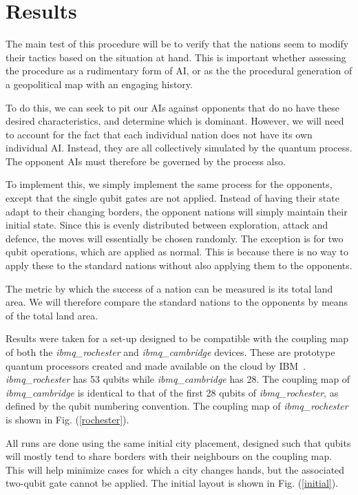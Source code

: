 \documentclass[conference]{IEEEtran}
\begin{document}
\section{Results}


The main test of this procedure will be to verify that the nations seem to modify their tactics based on the situation at hand. This is important whether assessing the procedure as a rudimentary form of AI, or as the the procedural generation of a geopolitical map with an engaging history.

To do this, we can seek to pit our AIs against opponents that do no have these desired characteristics, and determine which is dominant. However, we will need to account for the fact that each individual nation does not have its own individual AI. Instead, they are all collectively simulated by the quantum process. The opponent AIs must therefore be governed by the process also.

To implement this, we simply implement the same process for the opponents, except that the single qubit gates are not applied. Instead of having their state adapt to their changing borders, the opponent nations will simply maintain their initial state. Since this is evenly distributed between exploration, attack and defence, the moves will essentially be chosen randomly. The exception is for two qubit operations, which are applied as normal. This is because there is no way to apply these to the standard nations without also applying them to the opponents.

The metric by which the success of a nation can be measured is its total land area. We will therefore compare the standard nations to the opponents by means of the total land area.

Results were taken for a set-up designed to be compatible with the coupling map of both the \textit{ibmq\_rochester} and \textit{ibmq\_cambridge} devices. These are prototype quantum processors created and made available on the cloud by IBM~\cite{ibm-nisq}. \textit{ibmq\_rochester} has 53 qubits while \textit{ibmq\_cambridge} has 28. The coupling map of \textit{ibmq\_cambridge} is identical to that of the first 28 qubits of \textit{ibmq\_rochester}, as defined by the qubit numbering convention. The coupling map of \textit{ibmq\_rochester} is shown in Fig. (\ref{rochester}).

All runs are done using the same initial city placement, designed such that qubits will mostly tend to share borders with their neighbours on the coupling map. This will help minimize cases for which a city changes hands, but the associated two-qubit gate cannot be applied. The initial layout is shown in Fig. (\ref{initial}).
\end{document}
